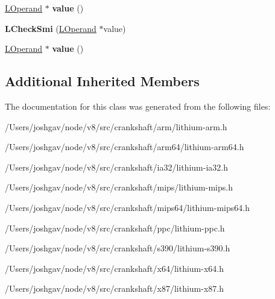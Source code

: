 \begin{DoxyCompactItemize}
\item 
\hyperlink{classv8_1_1internal_1_1_l_operand}{L\+Operand} $\ast$ {\bfseries value} ()\hypertarget{classv8_1_1internal_1_1_l_check_smi_a20019d7654701089d65be3568cb3d78f}{}\label{classv8_1_1internal_1_1_l_check_smi_a20019d7654701089d65be3568cb3d78f}

\item 
{\bfseries L\+Check\+Smi} (\hyperlink{classv8_1_1internal_1_1_l_operand}{L\+Operand} $\ast$value)\hypertarget{classv8_1_1internal_1_1_l_check_smi_a4841174d260da717d1ca9edef2157c7c}{}\label{classv8_1_1internal_1_1_l_check_smi_a4841174d260da717d1ca9edef2157c7c}

\item 
\hyperlink{classv8_1_1internal_1_1_l_operand}{L\+Operand} $\ast$ {\bfseries value} ()\hypertarget{classv8_1_1internal_1_1_l_check_smi_a20019d7654701089d65be3568cb3d78f}{}\label{classv8_1_1internal_1_1_l_check_smi_a20019d7654701089d65be3568cb3d78f}

\end{DoxyCompactItemize}
\subsection*{Additional Inherited Members}


The documentation for this class was generated from the following files\+:\begin{DoxyCompactItemize}
\item 
/\+Users/joshgav/node/v8/src/crankshaft/arm/lithium-\/arm.\+h\item 
/\+Users/joshgav/node/v8/src/crankshaft/arm64/lithium-\/arm64.\+h\item 
/\+Users/joshgav/node/v8/src/crankshaft/ia32/lithium-\/ia32.\+h\item 
/\+Users/joshgav/node/v8/src/crankshaft/mips/lithium-\/mips.\+h\item 
/\+Users/joshgav/node/v8/src/crankshaft/mips64/lithium-\/mips64.\+h\item 
/\+Users/joshgav/node/v8/src/crankshaft/ppc/lithium-\/ppc.\+h\item 
/\+Users/joshgav/node/v8/src/crankshaft/s390/lithium-\/s390.\+h\item 
/\+Users/joshgav/node/v8/src/crankshaft/x64/lithium-\/x64.\+h\item 
/\+Users/joshgav/node/v8/src/crankshaft/x87/lithium-\/x87.\+h\end{DoxyCompactItemize}
